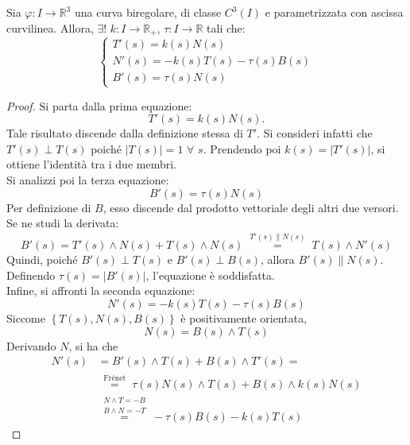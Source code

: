\begin{theorem}
    Sia $\varphi: I \to \mathbb{R}^3$ una curva biregolare, di classe $C^3(I)$ e parametrizzata con ascissa curvilinea. Allora, $\exists!$ $k:I\to \mathbb{R}_+$, $\tau:I\to\mathbb{R}$ tali che:
    \begin{equation}
        \begin{cases}
            T'(s)=k(s)N(s)\\
            N'(s)=-k(s)T(s)-\tau(s)B(s)\\
            B'(s)=\tau(s)N(s)
        \end{cases}
    \end{equation}
    \end{theorem}
    \begin{proof}
        Si parta dalla prima equazione: 
        \begin{equation}
            T'(s)=k(s)N(s).        
        \end{equation}
        Tale risultato discende dalla definizione stessa di $T'$. Si consideri infatti che $T'(s)\perp T(s)$ poiché $|T(s)|=1$ $\forall$ $s$. Prendendo poi $k(s)=|T'(s)|$, si ottiene l'identità tra i due membri.\\
        Si analizzi poi la terza equazione:
        \begin{equation}
            B'(s)=\tau(s)N(s)
        \end{equation}
        Per definizione di $B$, esso discende dal prodotto vettoriale degli altri due versori. Se ne studi la derivata:
        \begin{equation}
            B'(s)=T'(s)\wedge N(s) + T(s) \wedge N(s) \overset{\substack{T'(s)\parallel N(s)}}{=} T(s)\wedge N'(s)
        \end{equation}
        Quindi, poiché $B'(s)\perp T(s)$ e $B'(s) \perp B(s)$, allora $B'(s) \parallel N(s)$. Definendo $\tau(s)=|B'(s)|$, l'equazione è soddisfatta.\\
        Infine, si affronti la seconda equazione:
        \begin{equation}
            N'(s)= -k(s)T(s)- \tau(s)B(s)
        \end{equation}
        Siccome $\left\{T(s), N(s), B(s)\right\}$ è positivamente orientata,
        \begin{equation}
            N(s)=B(s) \wedge T(s)
        \end{equation}
        Derivando $N$, si ha che
        \begin{equation}
            \begin{aligned}
                N'(s)&=B'(s)\wedge T(s) + B(s) \wedge T'(s)=\\
                &\overset{\substack{\text{Frénet}}}{=} \tau(s)N(s)\wedge T(s) + B(s) \wedge k(s)N(s)\\
                &\overset{\substack{N \wedge T = -B\\B \wedge N =-T}}{=} -\tau(s)B(s)- k(s)T(s)
            \end{aligned}
        \end{equation}
    \end{proof}
